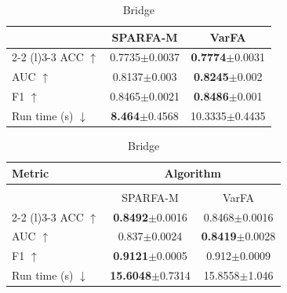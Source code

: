 \begin{table}[t!]
\begin{subtable}{\linewidth}
\begin{tabular}{lcc}
                                                      & SPARFA-M                               & VarFA                      \\
            \cmidrule(l){2-2} \cmidrule(l){3-3}
            ACC $\uparrow$                            & 0.7735$\pm$0.0037                      & \textbf{0.7774}$\pm$0.0031 \\
            AUC $\uparrow$                            & 0.8137$\pm$0.003                       & \textbf{0.8245}$\pm$0.002  \\
            F1 $\uparrow$                             & 0.8465$\pm$0.0021                      & \textbf{0.8486}$\pm$0.001  \\\hline
            Run time (s) $\downarrow$ \Tstrut \Bstrut & \textbf{8.464}$\pm$0.4568              & 10.3335$\pm$0.4435         \\
            \bottomrule
        \end{tabular}
        \label{tab:algebra}
    \end{subtable}
    \begin{subtable}{\linewidth}\centering
        \caption{Bridge}
        \begin{tabular}{lcc}
            \toprule
            \textbf{Metric}                            & \multicolumn{2}{c}{\textbf{Algorithm}}                              \\  \hline \\[-8pt]
                                                       & SPARFA-M                               & VarFA                      \\
            \cmidrule(l){2-2} \cmidrule(l){3-3}
            ACC $\uparrow$                             & \textbf{0.8492}$\pm$0.0016             & 0.8468$\pm$0.0016          \\
            AUC $\uparrow$                             & 0.837$\pm$0.0024                       & \textbf{0.8419}$\pm$0.0028 \\
            F1 $\uparrow$                              & \textbf{0.9121}$\pm$0.0005             & 0.912$\pm$0.0009           \\\hline
            Run time (s) $\downarrow$  \Tstrut \Bstrut & \textbf{15.6048}$\pm$0.7314            & 15.8558$\pm$1.046          \\
            \bottomrule
        \end{tabular}
        \label{tab:bridge}
    \end{subtable}
    \label{tab:real-data}
\end{table}

